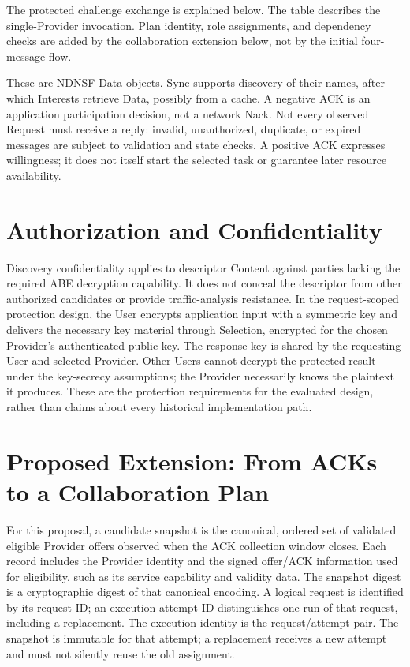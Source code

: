 The protected challenge exchange is explained below. The table describes the single-Provider invocation. Plan identity, role assignments, and dependency checks are added by the collaboration extension below, not by the initial four-message flow.

These are NDNSF Data objects. Sync supports discovery of their names, after which Interests retrieve Data, possibly from a cache. A negative ACK is an application participation decision, not a network Nack. Not every observed Request must receive a reply: invalid, unauthorized, duplicate, or expired messages are subject to validation and state checks. A positive ACK expresses willingness; it does not itself start the selected task or guarantee later resource availability.

\section{Authorization and Confidentiality}


Discovery confidentiality applies to descriptor Content against parties lacking the required ABE decryption capability. It does not conceal the descriptor from other authorized candidates or provide traffic-analysis resistance. In the request-scoped protection design, the User encrypts application input with a symmetric key and delivers the necessary key material through Selection, encrypted for the chosen Provider's authenticated public key. The response key is shared by the requesting User and selected Provider. Other Users cannot decrypt the protected result under the key-secrecy assumptions; the Provider necessarily knows the plaintext it produces. These are the protection requirements for the evaluated design, rather than claims about every historical implementation path.




\section{Proposed Extension: From ACKs to a Collaboration Plan}
For this proposal, a candidate snapshot is the canonical, ordered set of validated eligible Provider offers observed when the ACK collection window closes. Each record includes the Provider identity and the signed offer/ACK information used for eligibility, such as its service capability and validity data. The snapshot digest is a cryptographic digest of that canonical encoding. A logical request is identified by its request ID; an execution attempt ID distinguishes one run of that request, including a replacement. The execution identity is the request/attempt pair. The snapshot is immutable for that attempt; a replacement receives a new attempt and must not silently reuse the old assignment.

